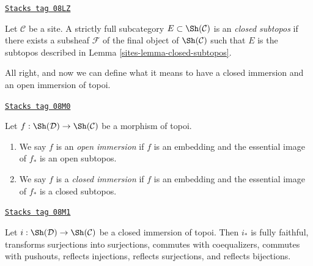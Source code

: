 \begin{definition}
\label{sites-definition-closed-subtopos}
\href{https://stacks.math.columbia.edu/tag/08LZ}{\texttt{Stacks tag 08LZ}}

Let $\mathcal{C}$ be a site. A strictly full subcategory
$E \subset \Sh(\mathcal{C})$ is an {\it closed subtopos}
if there exists a subsheaf $\mathcal{F}$ of the final object
of $\Sh(\mathcal{C})$ such that $E$ is the subtopos
described in Lemma \ref{sites-lemma-closed-subtopos}.
\end{definition}

All right, and now we can define what it means to have a closed immersion
and an open immersion of topoi.

\begin{definition}
\label{sites-definition-immersion-topoi}
\href{https://stacks.math.columbia.edu/tag/08M0}{\texttt{Stacks tag 08M0}}

Let $f : \Sh(\mathcal{D}) \to \Sh(\mathcal{C})$ be a morphism of topoi.
\begin{enumerate}
\item We say $f$ is an {\it open immersion} if $f$ is an embedding
and the essential image of $f_*$ is an open subtopos.
\item We say $f$ is a {\it closed immersion} if $f$ is an embedding
and the essential image of $f_*$ is a closed subtopos.
\end{enumerate}
\end{definition}

\begin{lemma}
\label{sites-lemma-closed-immersion}
\href{https://stacks.math.columbia.edu/tag/08M1}{\texttt{Stacks tag 08M1}}

Let $i : \Sh(\mathcal{D}) \to \Sh(\mathcal{C})$ be a closed immersion of
topoi. Then $i_*$ is fully faithful, transforms surjections into surjections,
commutes with coequalizers, commutes with pushouts, reflects injections,
reflects surjections, and reflects bijections.
\end{lemma}


